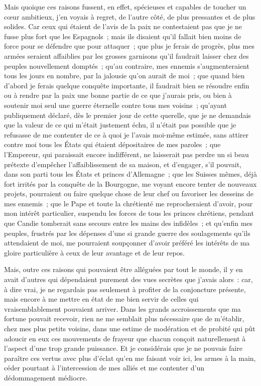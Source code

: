 \documentclass[french,twoside]{book} %
\begin{document}
Mais quoique ces raisons fussent, en effet, spécieuses et capables de toucher un cœur ambitieux, j’en voyais à regret, de l’autre côté, de plus pressantes et de plus solides. Car ceux qui étaient de l’avis de la paix ne contestaient pas que je ne fusse plus fort que les Espagnols ; mais ils disaient qu’il fallait bien moins de force pour se défendre que pour attaquer ; que plus je ferais de progrès, plus mes armées seraient affaiblies par les grosses garnisons qu’il faudrait laisser chez des peuples nouvellement domptés ; qu’au contraire, mes ennemis s’augmenteraient tous les jours en nombre, par la jalousie qu’on aurait de moi ; que quand bien d’abord je ferais quelque conquête importante, il faudrait bien se résoudre enfin ou à rendre par la paix une bonne partie de ce que j’aurais pris, ou bien à soutenir moi seul une guerre éternelle contre tous mes voisins ; qu’ayant publiquement déclaré, dès le premier jour de cette querelle, que je ne demandais que la valeur de ce qui m’était justement échu, il n’était pas possible que je refusasse de me contenter de ce à quoi je l’avais moi-même estimée, sans attirer contre moi tous les États qui étaient dépositaires de mes paroles ; que l’Empereur, qui paraissait encore indifférent, ne laisserait pas perdre un si beau prétexte d’empêcher l’affaiblissement de sa maison, et d’engager, s’il pouvait, dans son parti tous les États et princes d’Allemagne ; que les Suisses mêmes, déjà fort irrités par la conquête de la Bourgogne, me voyant encore tenter de nouveaux projets, pourraient ou faire quelque chose de leur chef ou favoriser les desseins de mes ennemis ; que le Pape et toute la chrétienté me reprocheraient d’avoir, pour mon intérêt particulier, suspendu les forces de tous les princes chrétiens, pendant que Candie tomberait sans secours entre les mains des infidèles ; et qu’enfin mes peuples, frustrés par les dépenses d’une si grande guerre des soulagements qu’ils attendaient de moi, me pourraient soupçonner d’avoir préféré les intérêts de ma gloire particulière à ceux de leur avantage et de leur repos.\par
Mais, outre ces raisons qui pouvaient être alléguées par tout le monde, il y en avait d’autres qui dépendaient purement des vues secrètes que j’avais alors : car, à dire vrai, je ne regardais pas seulement à profiter de la conjoncture présente, mais encore à me mettre en état de me bien servir de celles qui vraisemblablement pouvaient arriver. Dans les grands accroissements que ma fortune pouvait recevoir, rien ne me semblait plus nécessaire que de m’établir, chez mes plus petits voisins, dans une estime de modération et de probité qui pût adoucir en eux ces mouvements de frayeur que chacun conçoit naturellement à l’aspect d’une trop grande puissance. Et je considérais que je ne pouvais faire paraître ces vertus avec plus d’éclat qu’en me faisant voir ici, les armes à la main, céder pourtant à l’intercession de mes alliés et me contenter d’un dédommagement médiocre.\par
\end{document}
